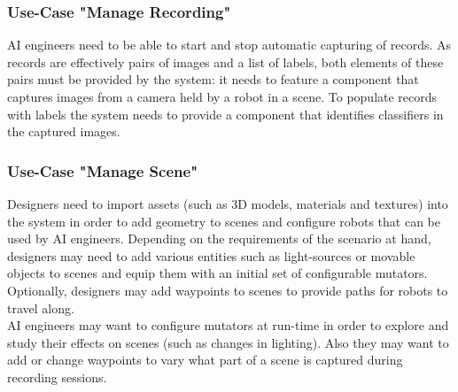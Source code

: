 \subsubsection{Use-Case "Manage Recording"}
\acs{AI} engineers need to be able to start and stop automatic capturing of records. As records are effectively pairs of images and a list of labels, both elements of these pairs must be provided by the system: it needs to feature a component that captures images from a camera held by a robot in a scene. To populate records with labels the system needs to provide a component that identifies classifiers in the captured images.

\subsubsection{Use-Case "Manage Scene"}
Designers need to import assets (such as 3D models, materials and textures) into the system in order to add geometry to scenes and configure robots that can be used by \acs{AI} engineers. Depending on the requirements of the scenario at hand, designers may need to add various entities such as light-sources or movable objects to scenes and equip them with an initial set of configurable mutators. Optionally, designers may add waypoints to scenes to provide paths for robots to travel along.\\
\acs{AI} engineers may want to configure mutators at run-time in order to explore and study their effects on scenes (such as changes in lighting). Also they may want to add or change waypoints to vary what part of a scene is captured during recording sessions.

